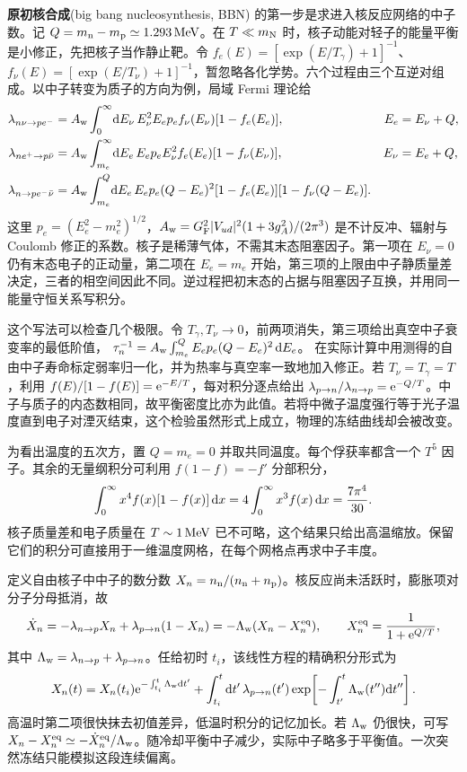 \textbf{原初核合成}(big bang nucleosynthesis, BBN) 的第一步是求进入核反应网络的中子数。记 $Q=m_{\rm n}-m_{\rm p}\simeq1.293\,{\rm MeV}$。在 $T\ll m_{\rm N}$ 时，核子动能对轻子的能量平衡是小修正，先把核子当作静止靶。令 $f_e(E)=[\exp(E/T_\gamma)+1]^{-1}$、$f_\nu(E)=[\exp(E/T_\nu)+1]^{-1}$，暂忽略各化学势。六个过程由三个互逆对组成。以中子转变为质子的方向为例，局域 Fermi 理论给
\begin{equation}\label{eq:cosmo-weak-rates}
 \begin{aligned}
 \lambda_{n\nu\to pe^-}
 &=A_{\rm w}\int_0^\infty\!\dd E_\nu\, E_\nu^2 E_e p_e
       f_\nu(E_\nu)[1-f_e(E_e)],
       &E_e&=E_\nu+Q,\\
 \lambda_{ne^+\to p\bar\nu}
 &=A_{\rm w}\int_{m_e}^\infty\!\dd E_e\, E_e p_e E_\nu^2
       f_e(E_e)[1-f_\nu(E_\nu)],
       &E_\nu&=E_e+Q,\\
 \lambda_{n\to pe^-\bar\nu}
 &=A_{\rm w}\int_{m_e}^{Q}\!\dd E_e\, E_e p_e(Q-E_e)^2
       [1-f_e(E_e)][1-f_\nu(Q-E_e)] .
 \end{aligned}
\end{equation}
这里 $p_e=(E_e^2-m_e^2)^{1/2}$，$A_{\rm w}=G_{\rm F}^2|V_{ud}|^2(1+3g_A^2)/(2\pi^3)$ 是不计反冲、辐射与 Coulomb 修正的系数。核子是稀薄气体，不需其末态阻塞因子。第一项在 $E_\nu=0$ 仍有末态电子的正动量，第二项在 $E_e=m_e$ 开始，第三项的上限由中子静质量差决定，三者的相空间因此不同。逆过程把初末态的占据与阻塞因子互换，并用同一能量守恒关系写积分。

这个写法可以检查几个极限。令 $T_\gamma,T_\nu\to0$，前两项消失，第三项给出真空中子衰变率的最低阶值， $\tau_n^{-1}=A_{\rm w}\int_{m_e}^Q E_ep_e(Q-E_e)^2\,\dd E_e$。
在实际计算中用测得的自由中子寿命标定弱率归一化，并为热率与真空率一致地加入修正。若 $T_\nu=T_\gamma=T$，利用 $f(E)/[1-f(E)]=\mathrm{e}^{-E/T}$，每对积分逐点给出 $\lambda_{p\to n}/\lambda_{n\to p}=\mathrm{e}^{-Q/T}$。中子与质子的内态数相同，故平衡密度比亦为此值。若将中微子温度强行等于光子温度直到电子对湮灭结束，这个检验虽然形式上成立，物理的冻结曲线却会被改变。

为看出温度的五次方，置 $Q=m_e=0$ 并取共同温度。每个俘获率都含一个 $T^5$ 因子。其余的无量纲积分可利用 $f(1-f)=-f'$ 分部积分，
\[
 \int_0^\infty x^4 f(x)[1-f(x)]\,\dd x
 =4\int_0^\infty x^3f(x)\,\dd x=\frac{7\pi^4}{30}.
\]
核子质量差和电子质量在 $T\sim1\,{\rm MeV}$ 已不可略，这个结果只给出高温缩放。保留它们的积分可直接用于一维温度网格，在每个网格点再求中子丰度。

定义自由核子中中子的数分数 $X_n=n_{\rm n}/(n_{\rm n}+n_{\rm p})$。核反应尚未活跃时，膨胀项对分子分母抵消，故
\begin{equation}\label{eq:cosmo-neutron-fraction}
 \dot X_n=-\lambda_{n\to p}X_n+\lambda_{p\to n}(1-X_n)
 =-\Lambda_{\rm w}(X_n-X_n^{\rm eq}),\qquad
 X_n^{\rm eq}=\frac{1}{1+\mathrm{e}^{Q/T}},
\end{equation}
其中 $\Lambda_{\rm w}=\lambda_{n\to p}+\lambda_{p\to n}$。任给初时 $t_i$，该线性方程的精确积分形式为
\[
 X_n(t)=X_n(t_i)\mathrm{e}^{-\int_{t_i}^t\Lambda_{\rm w}\dd t'}
 +\int_{t_i}^t\dd t'\,\lambda_{p\to n}(t')
 \exp\!\left[-\int_{t'}^t\Lambda_{\rm w}(t'')\dd t''\right].
\]
高温时第二项很快抹去初值差异，低温时积分的记忆加长。若 $\Lambda_{\rm w}$ 仍很快，可写 $X_n-X_n^{\rm eq}\simeq-\dot X_n^{\rm eq}/\Lambda_{\rm w}$。随冷却平衡中子减少，实际中子略多于平衡值。一次突然冻结只能模拟这段连续偏离。


